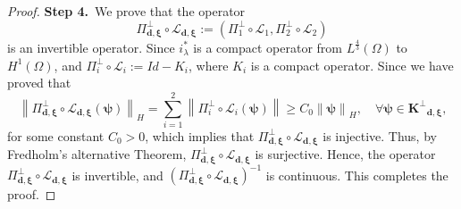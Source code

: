 \documentclass[10pt,a4paper]{amsart}
\begin{document}
\begin{proof}
\medskip
\textbf{Step 4.}~We prove that the operator $$\Pi^{\perp}_{\bm{d},\bm{\xi}}\circ\bm{\mathcal{L}}_{\bm{d},\bm{\xi}}:= \left(\Pi_1^{\perp}\circ\mathcal{L}_1,\Pi_2^{\perp}\circ\mathcal{L}_2\right)$$ is an invertible operator. Since $i_\lambda^*$ is a compact operator from $L^{\frac{4}{3}}(\Omega)$ to $H^1(\Omega)$, and $\Pi_i^{\perp}\circ\mathcal{L}_i:=Id-K_i$, where $K_i$ is a compact operator. Since we have proved that 
$$\left\|\Pi^{\perp}_{\bm{d},\bm{\xi}}\circ\bm{\mathcal{L}}_{\bm{d},\bm{\xi}}(\bm{\psi})\right\|_{H}=\sum_{i=1}^2\left\|\Pi_i^{\perp}\circ\mathcal{L}_i(\bm{\psi})\right\|\geq C_0\left\|\bm{\psi}\right\|_{H}, \quad\text{$\forall \bm{\psi}\in \bm{K^{\perp}}_{\bm{d},\bm{\xi}}$,}$$
 for some constant $C_0>0$, which implies that $\Pi^{\perp}_{\bm{d},\bm{\xi}}\circ\bm{\mathcal{L}}_{\bm{d},\bm{\xi}}$ is injective. Thus, by Fredholm's alternative Theorem, $\Pi^{\perp}_{\bm{d},\bm{\xi}}\circ\bm{\mathcal{L}}_{\bm{d},\bm{\xi}}$ is surjective. Hence, the operator $\Pi^{\perp}_{\bm{d},\bm{\xi}}\circ\bm{\mathcal{L}}_{\bm{d},\bm{\xi}}$ is invertible, and $\left(\Pi^{\perp}_{\bm{d},\bm{\xi}}\circ\bm{\mathcal{L}}_{\bm{d},\bm{\xi}}\right)^{-1}$ is continuous. This completes the proof.
 
    \end{proof}
\end{document}

